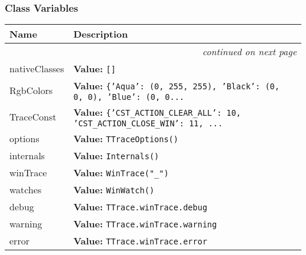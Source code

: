 
  \subsubsection{Class Variables}

    \vspace{-1cm}
\hspace{\varindent}\begin{longtable}{|p{\varnamewidth}|p{\vardescrwidth}|l}
\cline{1-2}
\cline{1-2} \centering \textbf{Name} & \centering \textbf{Description}& \\
\cline{1-2}
\endhead\cline{1-2}\multicolumn{3}{r}{\small\textit{continued on next page}}\\\endfoot\cline{1-2}
\endlastfoot\raggedright n\-a\-t\-i\-v\-e\-C\-l\-a\-s\-s\-e\-s\- & \raggedright \textbf{Value:} 
{\tt \texttt{[}\texttt{]}}&\\
\cline{1-2}
\raggedright R\-g\-b\-C\-o\-l\-o\-r\-s\- & \raggedright \textbf{Value:} 
{\tt \texttt{\{}\texttt{'}\texttt{Aqua}\texttt{'}\texttt{: }\texttt{(}0\texttt{, }255\texttt{, }255\texttt{)}\texttt{, }\texttt{'}\texttt{Black}\texttt{'}\texttt{: }\texttt{(}0\texttt{, }0\texttt{, }0\texttt{)}\texttt{, }\texttt{'}\texttt{Blue}\texttt{'}\texttt{: }\texttt{(}0\texttt{, }0\texttt{...}}&\\
\cline{1-2}
\raggedright T\-r\-a\-c\-e\-C\-o\-n\-s\-t\- & \raggedright \textbf{Value:} 
{\tt \texttt{\{}\texttt{'}\texttt{CST\_ACTION\_CLEAR\_ALL}\texttt{'}\texttt{: }10\texttt{, }\texttt{'}\texttt{CST\_ACTION\_CLOSE\_WIN}\texttt{'}\texttt{: }11\texttt{, }\texttt{...}}&\\
\cline{1-2}
\raggedright o\-p\-t\-i\-o\-n\-s\- & \raggedright \textbf{Value:} 
{\tt TTraceOptions()}&\\
\cline{1-2}
\raggedright i\-n\-t\-e\-r\-n\-a\-l\-s\- & \raggedright \textbf{Value:} 
{\tt Internals()}&\\
\cline{1-2}
\raggedright w\-i\-n\-T\-r\-a\-c\-e\- & \raggedright \textbf{Value:} 
{\tt WinTrace("\_")}&\\
\cline{1-2}
\raggedright w\-a\-t\-c\-h\-e\-s\- & \raggedright \textbf{Value:} 
{\tt WinWatch()}&\\
\cline{1-2}
\raggedright d\-e\-b\-u\-g\- & \raggedright \textbf{Value:} 
{\tt TTrace.winTrace.debug}&\\
\cline{1-2}
\raggedright w\-a\-r\-n\-i\-n\-g\- & \raggedright \textbf{Value:} 
{\tt TTrace.winTrace.warning}&\\
\cline{1-2}
\raggedright e\-r\-r\-o\-r\- & \raggedright \textbf{Value:} 
{\tt TTrace.winTrace.error}&\\
\cline{1-2}
\end{longtable}


